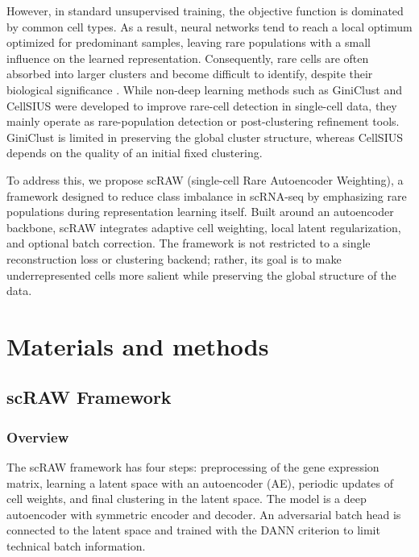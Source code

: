 \documentclass[11pt,a4paper]{article}
\begin{document}
However, in standard unsupervised training, the objective function is dominated by common cell types. As a result, neural networks tend to reach a local optimum optimized for predominant samples, leaving rare populations with a small influence on the learned representation. Consequently, rare cells are often absorbed into larger clusters and become difficult to identify, despite their biological significance \cite{grun2015}. While non-deep learning methods such as GiniClust \cite{jiang2016} and CellSIUS \cite{wegmann2019} were developed to improve rare-cell detection in single-cell data, they mainly operate as rare-population detection or post-clustering refinement tools. GiniClust is limited in preserving the global cluster structure, whereas CellSIUS depends on the quality of an initial fixed clustering.

To address this, we propose scRAW (single-cell Rare Autoencoder Weighting), a framework designed to reduce class imbalance in scRNA-seq by emphasizing rare populations during representation learning itself. Built around an autoencoder backbone, scRAW integrates adaptive cell weighting, local latent regularization, and optional batch correction. The framework is not restricted to a single reconstruction loss or clustering backend; rather, its goal is to make underrepresented cells more salient while preserving the global structure of the data.




\section{Materials and methods}
\subsection{scRAW Framework}
\subsubsection*{Overview}

The scRAW framework has four steps: preprocessing of the gene expression matrix, learning a latent space with an autoencoder (AE), periodic updates of cell weights, and final clustering in the latent space. The model is a deep autoencoder with symmetric encoder and decoder. An adversarial batch head is connected to the latent space and trained with the DANN criterion \cite{ganin2016} to limit technical batch information.
\end{document}
